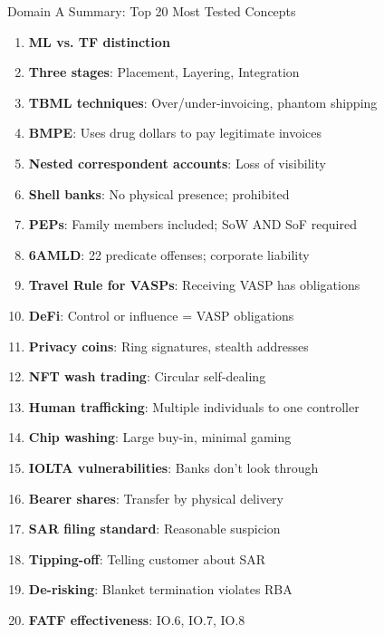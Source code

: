 \documentclass{beamer}
\begin{document}
										\begin{frame}{Domain A Summary: Top 20 Most Tested Concepts}
											\begin{enumerate}
												\item \textbf{ML vs. TF distinction}
												\item \textbf{Three stages}: Placement, Layering, Integration
												\item \textbf{TBML techniques}: Over/under-invoicing, phantom shipping
												\item \textbf{BMPE}: Uses drug dollars to pay legitimate invoices
												\item \textbf{Nested correspondent accounts}: Loss of visibility
												\item \textbf{Shell banks}: No physical presence; prohibited
												\item \textbf{PEPs}: Family members included; SoW AND SoF required
												\item \textbf{6AMLD}: 22 predicate offenses; corporate liability
												\item \textbf{Travel Rule for VASPs}: Receiving VASP has obligations
												\item \textbf{DeFi}: Control or influence = VASP obligations
												\item \textbf{Privacy coins}: Ring signatures, stealth addresses
												\item \textbf{NFT wash trading}: Circular self-dealing
												\item \textbf{Human trafficking}: Multiple individuals to one controller
												\item \textbf{Chip washing}: Large buy-in, minimal gaming
												\item \textbf{IOLTA vulnerabilities}: Banks don't look through
												\item \textbf{Bearer shares}: Transfer by physical delivery
												\item \textbf{SAR filing standard}: Reasonable suspicion
												\item \textbf{Tipping-off}: Telling customer about SAR
												\item \textbf{De-risking}: Blanket termination violates RBA
												\item \textbf{FATF effectiveness}: IO.6, IO.7, IO.8
											\end{enumerate}
										\end{frame}
										
\end{document}
